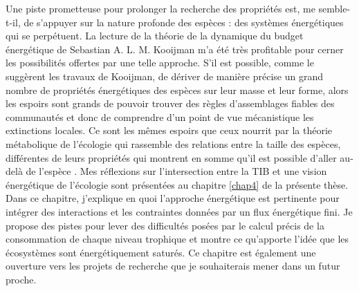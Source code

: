 Une piste prometteuse pour prolonger la recherche des propriétés est, me
semble-t-il, de s'appuyer sur la nature profonde des espèces : des
systèmes énergétiques qui se perpétuent. La lecture de la théorie de la
dynamique du budget énergétique de Sebastian A. L. M. Kooijman
\citep{Kooijman2000a} m'a été très profitable pour cerner les
possibilités offertes par une telle approche. S'il est possible, comme
le suggèrent les travaux de Kooijman, de dériver de manière précise un
grand nombre de propriétés énergétiques des espèces sur leur masse et
leur forme, alors les espoirs sont grands de pouvoir trouver des règles
d'assemblages fiables des communautés et donc de comprendre d'un point
de vue mécanistique les extinctions locales. Ce sont les mêmes espoirs
que ceux nourrit par la théorie métabolique de l'écologie qui rassemble
des relations entre la taille des espèces, différentes de leurs
propriétés \citep{Brown2004} qui montrent en somme qu'il est possible
d'aller au-delà de l'espèce \citep{Poisot2015}. Mes réflexions sur
l'intersection entre la TIB et une vision énergétique de l'écologie sont
présentées au chapitre \ref{chap4} de la présente thèse. Dans ce
chapitre, j'explique en quoi l'approche énergétique est pertinente pour
intégrer des interactions et les contraintes données par un flux
énergétique fini. Je propose des pistes pour lever des difficultés
posées par le calcul précis de la consommation de chaque niveau
trophique et montre ce qu'apporte l'idée que les écosystèmes sont
énergétiquement saturés. Ce chapitre est également une ouverture vers
les projets de recherche que je souhaiterais mener dans un futur proche.
